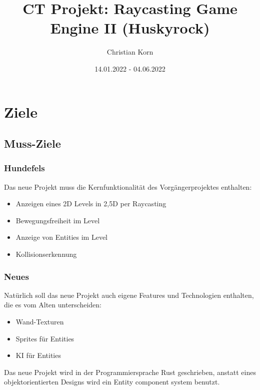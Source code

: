 \documentclass[a4paper,titlepage]{article}
\title{CT Projekt: Raycasting Game Engine II (Huskyrock)}
\author{Christian Korn}
\date{14.01.2022 - 04.06.2022}
\begin{document}
    \maketitle
    \tableofcontents
    
    
    \newpage
    
    \section{Ziele}
    
    \subsection{Muss-Ziele}
    
    \subsubsection*{Hundefels}
    
    Das neue Projekt muss die Kernfunktionalität des Vorgängerprojektes enthalten:
    
    \begin{itemize}
        \item Anzeigen eines 2D Levels in 2,5D per Raycasting
        \item Bewegungsfreiheit im Level
        \item Anzeige von Entities im Level
        \item Kollisionserkennung
    \end{itemize}
    
    \subsubsection*{Neues}
    
    Natürlich soll das neue Projekt auch eigene Features und Technologien enthalten, die es vom Alten unterscheiden:
    
    \begin{itemize}
        \item Wand-Texturen
        \item Sprites für Entities
        \item KI für Entities
    \end{itemize}
    
    Das neue Projekt wird in der Programmiersprache Rust geschrieben,
    anstatt eines objektorientierten Designs wird ein Entity component system benutzt.
    
\end{document}
